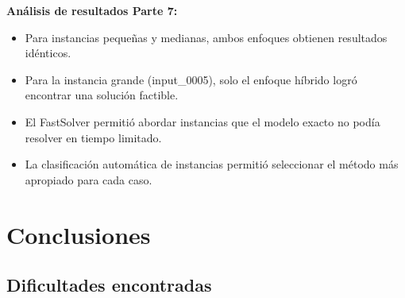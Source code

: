 \documentclass[a4paper,12pt]{article}
\begin{document}
\textbf{Análisis de resultados Parte 7:}
\begin{itemize}
    \item Para instancias pequeñas y medianas, ambos enfoques obtienen resultados idénticos.
    \item Para la instancia grande (input\_0005), solo el enfoque híbrido logró encontrar una solución factible.
    \item El FastSolver permitió abordar instancias que el modelo exacto no podía resolver en tiempo limitado.
    \item La clasificación automática de instancias permitió seleccionar el método más apropiado para cada caso.
\end{itemize}

\clearpage

\section{Conclusiones}

\subsection*{Dificultades encontradas}
\end{document}
